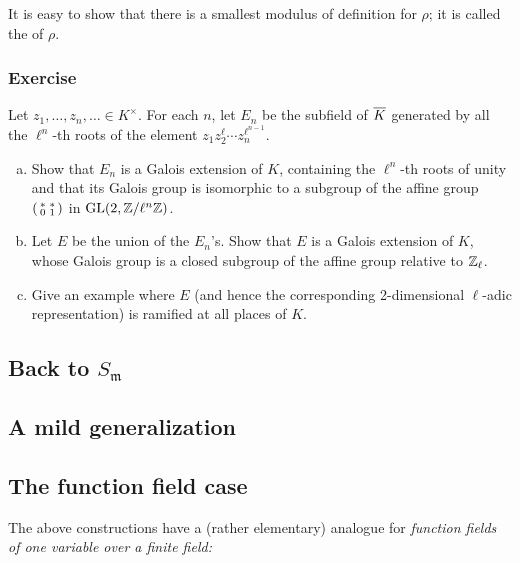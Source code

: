 \begin{obs}
It is easy to show that there is a smallest modulus of definition for $\rho$;
it is called the  of $\rho$.
\end{obs}

\subsubsection*{Exercise}
Let $z_1, \dots, z_n, \dots \in K^\times$. For each $n$, let $E_n$ be the
\dpage
subfield of $\overline{K}$ generated by all the $\ell^n$-th roots of the element
$z_1 z_2^\ell \cdots z_n^{\ell^{n-1}}$.
\begin{enumerate}[a)]
\item Show that $E_n$ is a Galois extension of $K$, containing the $\ell^n$-th
	roots of unity and that its Galois group is isomorphic to a subgroup of
	the affine group $
	\begin{psmallmatrix}
		* & * \\
		0 & 1
	\end{psmallmatrix} 
	$ in $\operatorname{GL}(2, \mathbb{Z}/\ell^n\mathbb{Z})$.
\item Let $E$ be the union of the $E_n$'s. Show that $E$ is a Galois extension
	of $K$, whose Galois group is a closed subgroup of the affine group
	relative to $\mathbb{Z}_\ell$.
\item Give an example where $E$ (and hence the corresponding 2-dimensional
	$\ell$-adic representation) is ramified at all places of $K$.
\end{enumerate}

\subsection{Back to \texorpdfstring{$S_{\mathfrak{m}}$}{Sm}}
\label{sec:III_23}

\subsection{A mild generalization}
\label{sec:III_24}

\subsection{The function field case}
\label{sec:III_25}
The above constructions have a (rather elementary) analogue
for \emph{function fields of one variable over a finite field:}

